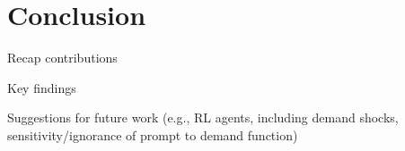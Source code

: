 \section{Conclusion}\label{sec:con}
Recap contributions

Key findings

Suggestions for future work (e.g., RL agents, including demand shocks, sensitivity/ignorance of prompt to demand function)